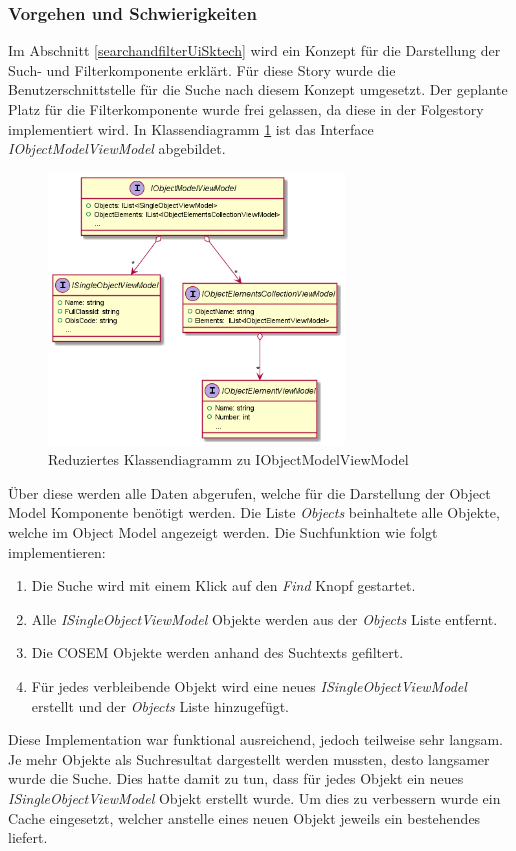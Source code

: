 \subsubsection{Vorgehen und Schwierigkeiten}
Im Abschnitt \ref{searchandfilterUiSktech} wird ein Konzept für die Darstellung der Such- und Filterkomponente erklärt.
Für diese Story wurde die Benutzerschnittstelle für die Suche nach diesem Konzept umgesetzt.
Der geplante Platz für die Filterkomponente wurde frei gelassen, da diese in der Folgestory implementiert wird.
In Klassendiagramm \ref{fig:objectModelVMClassDiagram} ist das Interface \textit{IObjectModelViewModel} abgebildet.
\begin{figure}
   \centering
   \includegraphics[width=0.7\textwidth]{gfx/OMVM.png}
   \caption{
      Reduziertes Klassendiagramm zu IObjectModelViewModel
      }
      \label{fig:objectModelVMClassDiagram}
\end{figure}
Über diese werden alle Daten abgerufen, welche für die Darstellung der Object Model Komponente benötigt werden.
Die Liste \textit{Objects} beinhaltete alle Objekte, welche im Object Model angezeigt werden.
Die Suchfunktion wie folgt implementieren:
\begin{enumerate}
   \item Die Suche wird mit einem Klick auf den \textit{Find} Knopf gestartet.
   \item Alle \textit{ISingleObjectViewModel} Objekte werden aus der \textit{Objects} Liste entfernt.
   \item Die \ac{COSEM} Objekte werden anhand des Suchtexts gefiltert.
   \item Für jedes verbleibende Objekt wird eine neues \textit{ISingleObjectViewModel} erstellt und der \textit{Objects} Liste hinzugefügt.
\end{enumerate} 
Diese Implementation war funktional ausreichend, jedoch teilweise sehr langsam.
Je mehr Objekte als Suchresultat dargestellt werden mussten, desto langsamer wurde die Suche.
Dies hatte damit zu tun, dass für jedes Objekt ein neues \textit{ISingleObjectViewModel} Objekt erstellt wurde.
Um dies zu verbessern wurde ein Cache eingesetzt, welcher anstelle eines neuen Objekt jeweils ein bestehendes liefert.

